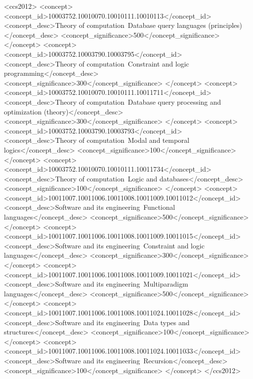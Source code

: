 \documentclass[acmsmall]{acmart}\settopmatter{}
\begin{document}


\begin{CCSXML}
<ccs2012>
<concept>
<concept_id>10003752.10010070.10010111.10010113</concept_id>
<concept_desc>Theory of computation~Database query languages (principles)</concept_desc>
<concept_significance>500</concept_significance>
</concept>
<concept>
<concept_id>10003752.10003790.10003795</concept_id>
<concept_desc>Theory of computation~Constraint and logic programming</concept_desc>
<concept_significance>300</concept_significance>
</concept>
<concept>
<concept_id>10003752.10010070.10010111.10011711</concept_id>
<concept_desc>Theory of computation~Database query processing and optimization (theory)</concept_desc>
<concept_significance>300</concept_significance>
</concept>
<concept>
<concept_id>10003752.10003790.10003793</concept_id>
<concept_desc>Theory of computation~Modal and temporal logics</concept_desc>
<concept_significance>100</concept_significance>
</concept>
<concept>
<concept_id>10003752.10010070.10010111.10011734</concept_id>
<concept_desc>Theory of computation~Logic and databases</concept_desc>
<concept_significance>100</concept_significance>
</concept>
<concept>
<concept_id>10011007.10011006.10011008.10011009.10011012</concept_id>
<concept_desc>Software and its engineering~Functional languages</concept_desc>
<concept_significance>500</concept_significance>
</concept>
<concept>
<concept_id>10011007.10011006.10011008.10011009.10011015</concept_id>
<concept_desc>Software and its engineering~Constraint and logic languages</concept_desc>
<concept_significance>300</concept_significance>
</concept>
<concept>
<concept_id>10011007.10011006.10011008.10011009.10011021</concept_id>
<concept_desc>Software and its engineering~Multiparadigm languages</concept_desc>
<concept_significance>500</concept_significance>
</concept>
<concept>
<concept_id>10011007.10011006.10011008.10011024.10011028</concept_id>
<concept_desc>Software and its engineering~Data types and structures</concept_desc>
<concept_significance>100</concept_significance>
</concept>
<concept>
<concept_id>10011007.10011006.10011008.10011024.10011033</concept_id>
<concept_desc>Software and its engineering~Recursion</concept_desc>
<concept_significance>100</concept_significance>
</concept>
</ccs2012>
\end{CCSXML}

\end{document}
